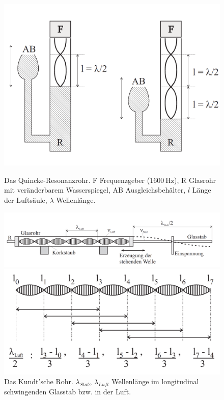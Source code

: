\documentclass[11pt]{scrartcl}
\begin{document}
\begin{figure}[H]
    \begin{center}
        \begin{minipage}[t]{.46\linewidth} %
            \includegraphics[width=\linewidth]{pics/Fig1.png}
            \caption[Quincke-Resonanzrohr]{Das Quincke-Resonanzrohr. F Frequenzgeber ($\SI[]{1600}{\hertz}$), R Glasrohr mit veränderbarem Wasserspiegel, AB Ausgleichsbehälter, $l$ Länge der
            Luftsäule, $\lambda$ Wellenlänge.}
            \label{fig:Quincke}
        \end{minipage}
        \hspace{.02\linewidth}%
        \begin{minipage}[t]{.51\linewidth} %
            \vspace{-10\baselineskip}
            \includegraphics[width=\linewidth]{pics/Fig2.png}
            \caption[Kundt'sches Rohr]{Das Kundt'sche Rohr. $\lambda_{Stab}$, $\lambda_{Luft}$ Wellenlänge im longitudinal schwingenden Glasstab bzw. in der Luft.}
            \label{fig:Kundt}
            \includegraphics[width=\linewidth]{pics/Fig3.png}

\end{minipage}
\end{center}
\end{figure}
\end{document}

